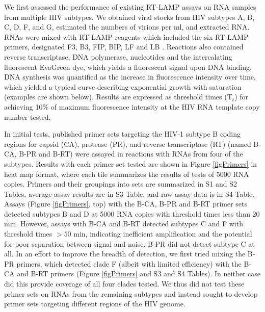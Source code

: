 \documentclass[../sherrill-Mix_thesis.tex]{subfiles}
\begin{document}
	We first assessed the performance of existing RT-LAMP assays on RNA samples from multiple HIV subtypes. We obtained viral stocks from HIV subtypes A, B, C, D, F, and G, estimated the numbers of virions per ml, and extracted RNA. RNAs were mixed with RT-LAMP reagents which included the six RT-LAMP primers, designated F3, B3, FIP, BIP, LF and LB \citep{Notomi2000}. Reactions also contained reverse transcriptase, DNA polymerase, nucleotides and the intercalating fluorescent EvaGreen dye, which yields a fluorescent signal upon DNA binding. DNA synthesis was quantified as the increase in fluorescence intensity over time, which yielded a typical curve describing exponential growth with saturation (examples are shown below). Results are expressed as threshold times (T$_t$) for achieving 10\% of maximum fluorescence intensity at the HIV RNA template copy number tested.

	In initial tests, published primer sets targeting the HIV-1 subtype B coding regions for capsid (CA), protease (PR), and reverse transcriptase (RT) (named B-CA, B-PR and B-RT) were assayed in reactions with RNAs from four of the subtypes. Results with each primer set tested are shown in Figure \ref{figPrimers} in heat map format, where each tile summarizes the results of tests of 5000 RNA copies. Primers and their groupings into sets are summarized in S1 and S2 Tables, average assay results are in S3 Table, and raw assay data is in S4 Table. Assays (Figure \ref{figPrimers}, top) with the B-CA, B-PR and B-RT primer sets detected subtypes B and D at 5000 RNA copies with threshold times less than 20 min. However, assays with B-CA and B-RT detected subtypes C and F with threshold times $>50$ min, indicating inefficient amplification and the potential for poor separation between signal and noise. B-PR did not detect subtype C at all. In an effort to improve the breadth of detection, we first tried mixing the B-PR primers, which detected clade F (albeit with limited efficiency) with the B-CA and B-RT primers (Figure \ref{figPrimers} and S3 and S4 Tables). In neither case did this provide coverage of all four clades tested. We thus did not test these primer sets on RNAs from the remaining subtypes and instead sought to develop primer sets targeting different regions of the HIV genome.
\end{document}
